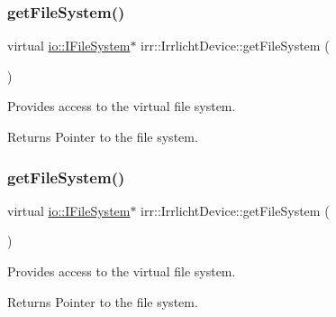\subsubsection{\texorpdfstring{get\+File\+System()}{getFileSystem()}\hspace{0.1cm}{\footnotesize\ttfamily [2/3]}}
{\footnotesize\ttfamily virtual \hyperlink{classirr_1_1io_1_1IFileSystem}{io\+::\+I\+File\+System}$\ast$ irr\+::\+Irrlicht\+Device\+::get\+File\+System (\begin{DoxyParamCaption}{ }\end{DoxyParamCaption})\hspace{0.3cm}{\ttfamily [pure virtual]}}



Provides access to the virtual file system. 

\begin{DoxyReturn}{Returns}
Pointer to the file system. 
\end{DoxyReturn}
\mbox{\label{classirr_1_1IrrlichtDevice_a3d8d2dee2f57aa7e6c0d14592de3e6ed}} 
\subsubsection{\texorpdfstring{get\+File\+System()}{getFileSystem()}\hspace{0.1cm}{\footnotesize\ttfamily [3/3]}}
{\footnotesize\ttfamily virtual \hyperlink{classirr_1_1io_1_1IFileSystem}{io\+::\+I\+File\+System}$\ast$ irr\+::\+Irrlicht\+Device\+::get\+File\+System (\begin{DoxyParamCaption}{ }\end{DoxyParamCaption})\hspace{0.3cm}{\ttfamily [pure virtual]}}



Provides access to the virtual file system. 

\begin{DoxyReturn}{Returns}
Pointer to the file system. 
\end{DoxyReturn}
\mbox{\label{classirr_1_1IrrlichtDevice_af7491b8c5ef4f71360f30fbad90ae35c}} 
